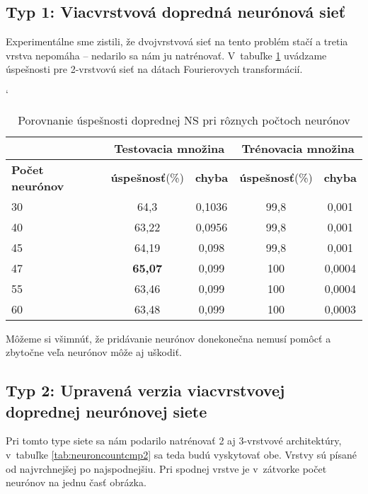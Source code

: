 \subsection{Typ 1: Viacvrstvová dopredná neurónová sieť}

Experimentálne sme zistili, že dvojvrstvová sieť na tento problém stačí a tretia vrstva nepomáha -- nedarilo sa nám ju natrénovať. V~tabuľke \ref{tab:neuroncountcmp} uvádzame úspešnosti pre 2-vrstvovú sieť na dátach Fourierovych transformácií.

\begin{table}[htp]
\catcode` %
\centering
\begin{tabular}{|l|c|c|c|c|}
\cline{2-5}
\multicolumn{1}{l}{} & \multicolumn{2}{|c|}{\textbf{Testovacia množina}} & \multicolumn{2}{c|}{\textbf{Trénovacia množina}}\\ 
\hline
\textbf{Počet neurónov} & \textbf{úspešnosť}(\%) & \textbf{chyba} & \textbf{úspešnosť}(\%) & \textbf{chyba} \\ \hline
30 & 64,3 & 0,1036 & 99,8 & 0,001 \\ \hline
40 & 63,22 & 0,0956 & 99,8 & 0,001 \\ \hline
45 & 64,19 & 0,098 & 99,8 & 0,001 \\ \hline
47 & \textbf{65,07} & 0,099 & 100 & 0,0004 \\ \hline
55 & 63,46 & 0,099 & 100 & 0,0004 \\ \hline
60 & 63,48 & 0,099 & 100 & 0,0003 \\ 
\hline
\end{tabular}
\caption{Porovnanie úspešnosti doprednej NS pri rôznych počtoch neurónov}
\label{tab:neuroncountcmp}
\end{table}

Môžeme si všimnúť, že pridávanie neurónov donekonečna nemusí pomôcť a zbytočne veľa neurónov môže aj uškodiť.

\subsection{Typ 2: Upravená verzia viacvrstvovej doprednej neurónovej siete}

Pri tomto type siete sa nám podarilo natrénovať 2 aj 3-vrstvové architektúry, v~tabuľke \ref{tab:neuroncountcmp2} sa teda budú vyskytovať obe. Vrstvy sú písané od najvrchnejšej po najspodnejšiu. Pri spodnej vrstve je v~zátvorke počet neurónov na jednu časť obrázka.

